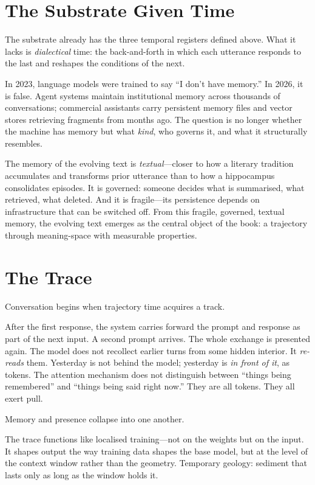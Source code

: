 \section{The Substrate Given Time}

The substrate already has the three temporal registers defined above. What it lacks is \emph{dialectical} time: the back-and-forth in which each utterance responds to the last and reshapes the conditions of the next.

In 2023, language models were trained to say ``I don't have memory.'' In 2026, it is false. Agent systems maintain institutional memory across thousands of conversations; commercial assistants carry persistent memory files and vector stores retrieving fragments from months ago. The question is no longer whether the machine has memory but what \emph{kind}, who governs it, and what it structurally resembles.

The memory of the evolving text is \emph{textual}---closer to how a literary tradition accumulates and transforms prior utterance than to how a hippocampus consolidates episodes. It is governed: someone decides what is summarised, what retrieved, what deleted. And it is fragile---its persistence depends on infrastructure that can be switched off. From this fragile, governed, textual memory, the evolving text emerges as the central object of the book: a trajectory through meaning-space with measurable properties.


\section{The Trace}

Conversation begins when trajectory time acquires a track.

After the first response, the system carries forward the prompt and response as part of the next input. A second prompt arrives. The whole exchange is presented again. The model does not recollect earlier turns from some hidden interior. It \emph{re-reads} them. Yesterday is not behind the model; yesterday is \emph{in front of it}, as tokens. The attention mechanism does not distinguish between ``things being remembered'' and ``things being said right now.'' They are all tokens. They all exert pull.

Memory and presence collapse into one another.

The trace functions like localised training---not on the weights but on the input. It shapes output the way training data shapes the base model, but at the level of the context window rather than the geometry. Temporary geology: sediment that lasts only as long as the window holds it.

